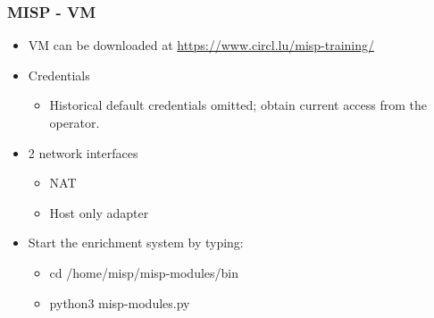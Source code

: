 

\begin{frame}[t,plain]
\titlepage
\end{frame}

\begin{frame}
    \frametitle{MISP - VM}
    \begin{itemize}
    \item VM can be downloaded at \url{https://www.circl.lu/misp-training/}
    \item Credentials
        \begin{itemize}
            \item Historical default credentials omitted; obtain current access from the operator.

        \end{itemize}
    \item 2 network interfaces
        \begin{itemize}
            \item NAT
            \item Host only adapter
        \end{itemize}
    \item Start the enrichment system by typing:
        \begin{itemize}
            \item cd /home/misp/misp-modules/bin
            \item python3 misp-modules.py
        \end{itemize}
   \end{itemize}
\end{frame}

